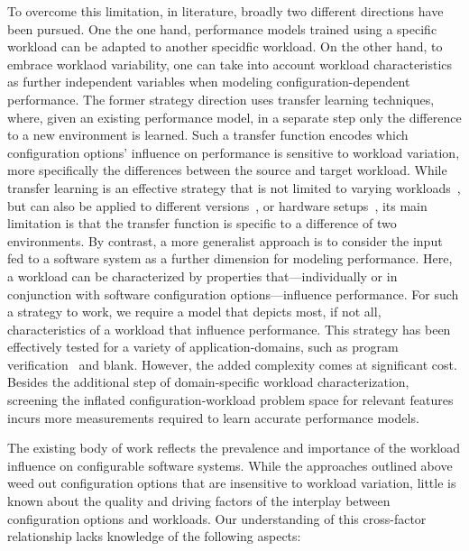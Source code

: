 To overcome this limitation, in literature, broadly two different directions have been pursued. One the one hand, performance models trained using a specific workload can be adapted to another specidfic workload. On the other hand, to embrace worklaod variability, one can take into account workload characteristics as further independent variables when modeling configuration-dependent performance.
The former strategy direction uses transfer learning techniques, where, given an existing performance model, in a separate step only the difference to a new environment is learned. Such a transfer function encodes which configuration options’ influence on performance is sensitive to workload variation, more specifically the differences between the source and target workload. While transfer learning is an effective strategy that is not limited to varying workloads~\cite{jamshidi_learning_2018}, but can also be applied to different versions~\cite{jamishidi_transfer_2017,jamshidi_transfer_gp_2017,martin_transfer_2021}, or hardware setups~\cite{ding_bayesian_2020}, its main limitation is that the transfer function is specific to a difference of two environments.
By contrast, a more generalist approach is to consider the input fed to a software system as a further dimension for modeling performance. Here, a workload can be characterized by properties that---individually or in conjunction with software configuration options---influence performance. For such a strategy to work, we require a model that depicts most, if not all, characteristics of a workload that influence performance. This strategy has been effectively tested for a  variety of application-domains, such as program verification~\cite{koc_satune_2021} and {\color{red}blank}. However, the added complexity comes at significant cost. Besides the additional step of domain-specific workload characterization, screening the inflated configuration-workload problem space for relevant features incurs more measurements required to learn accurate performance models.  

The existing body of work reflects the prevalence and importance of the workload influence on configurable software systems. While the approaches outlined above weed out configuration options that are insensitive to workload variation, little is known about the quality and driving factors of the interplay between configuration options and workloads. Our understanding of this cross-factor relationship lacks knowledge of the following aspects:

